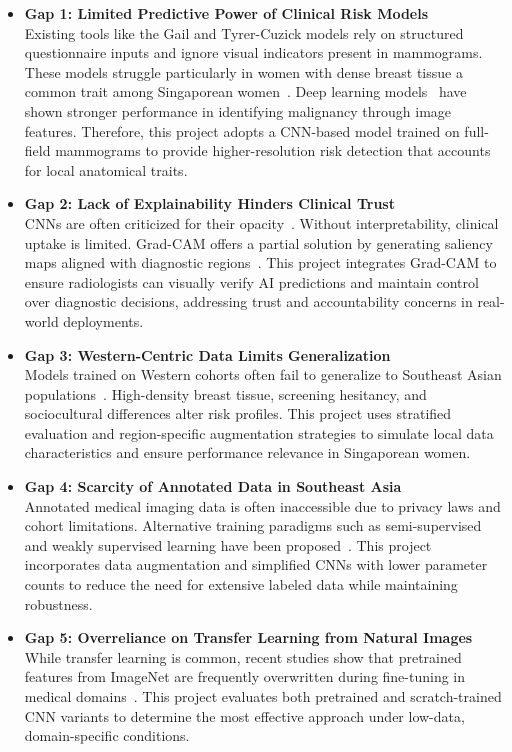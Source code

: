 \documentclass[12pt]{article}
\begin{document}
\begin{itemize}
    \item \textbf{Gap 1: Limited Predictive Power of Clinical Risk Models}\\
    Existing tools like the Gail and Tyrer-Cuzick models rely on structured questionnaire inputs and ignore visual indicators present in mammograms. These models struggle particularly in women with dense breast tissue a common trait among Singaporean women~\cite{6}. Deep learning models~\cite{1,7} have shown stronger performance in identifying malignancy through image features. Therefore, this project adopts a CNN-based model trained on full-field mammograms to provide higher-resolution risk detection that accounts for local anatomical traits.

    \item \textbf{Gap 2: Lack of Explainability Hinders Clinical Trust}\\
    CNNs are often criticized for their opacity~\cite{3,5}. Without interpretability, clinical uptake is limited. Grad-CAM offers a partial solution by generating saliency maps aligned with diagnostic regions~\cite{5}. This project integrates Grad-CAM to ensure radiologists can visually verify AI predictions and maintain control over diagnostic decisions, addressing trust and accountability concerns in real-world deployments.

    \item \textbf{Gap 3: Western-Centric Data Limits Generalization}\\
    Models trained on Western cohorts often fail to generalize to Southeast Asian populations~\cite{6}. High-density breast tissue, screening hesitancy, and sociocultural differences alter risk profiles. This project uses stratified evaluation and region-specific augmentation strategies to simulate local data characteristics and ensure performance relevance in Singaporean women.

    \item \textbf{Gap 4: Scarcity of Annotated Data in Southeast Asia}\\
    Annotated medical imaging data is often inaccessible due to privacy laws and cohort limitations. Alternative training paradigms such as semi-supervised and weakly supervised learning have been proposed~\cite{4}. This project incorporates data augmentation and simplified CNNs with lower parameter counts to reduce the need for extensive labeled data while maintaining robustness.

    \item \textbf{Gap 5: Overreliance on Transfer Learning from Natural Images}\\
    While transfer learning is common, recent studies show that pretrained features from ImageNet are frequently overwritten during fine-tuning in medical domains~\cite{2}. This project evaluates both pretrained and scratch-trained CNN variants to determine the most effective approach under low-data, domain-specific conditions.
\end{itemize}
\end{document}
